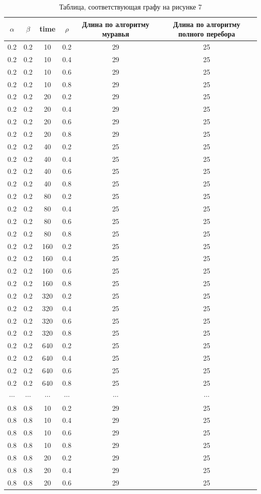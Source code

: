 \documentclass[a4paper,14pt]{article} %
\begin{document}
\begin{table}[H]
	\caption{Таблица, соответствующая графу на рисунке 7}
\begin{tabular}{|c|c|c|c|c|c|}
		\hline
		$\alpha$&$\beta$&time&$\rho$&Длина по алгоритму муравья&Длина по алгоритму полного перебора \\
		\hline
0.2&0.2&10&0.2&29&25\\
0.2&0.2&10&0.4&29&25\\
0.2&0.2&10&0.6&29&25\\
0.2&0.2&10&0.8&29&25\\
0.2&0.2&20&0.2&29&25\\
0.2&0.2&20&0.4&29&25\\
0.2&0.2&20&0.6&29&25\\
0.2&0.2&20&0.8&29&25\\
0.2&0.2&40&0.2&25&25\\
0.2&0.2&40&0.4&25&25\\
0.2&0.2&40&0.6&25&25\\
0.2&0.2&40&0.8&25&25\\
0.2&0.2&80&0.2&25&25\\
0.2&0.2&80&0.4&25&25\\
0.2&0.2&80&0.6&25&25\\
0.2&0.2&80&0.8&25&25\\
0.2&0.2&160&0.2&25&25\\
0.2&0.2&160&0.4&25&25\\
0.2&0.2&160&0.6&25&25\\
0.2&0.2&160&0.8&25&25\\
0.2&0.2&320&0.2&25&25\\
0.2&0.2&320&0.4&25&25\\
0.2&0.2&320&0.6&25&25\\
0.2&0.2&320&0.8&25&25\\
0.2&0.2&640&0.2&25&25\\
0.2&0.2&640&0.4&25&25\\
0.2&0.2&640&0.6&25&25\\
0.2&0.2&640&0.8&25&25\\
$\cdots$&$\cdots$&$\cdots$&$\cdots$&$\cdots$&$\cdots$\\
0.8&0.8&10&0.2&29&25\\
0.8&0.8&10&0.4&29&25\\
0.8&0.8&10&0.6&29&25\\
0.8&0.8&10&0.8&29&25\\
0.8&0.8&20&0.2&29&25\\
0.8&0.8&20&0.4&29&25\\
0.8&0.8&20&0.6&29&25\\

\end{tabular}
\end{table}
\end{document}
